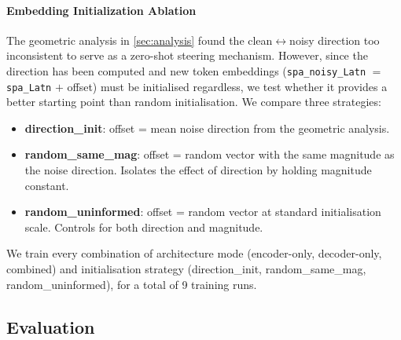 \documentclass[11pt]{article}
\begin{document}
\paragraph{Embedding Initialization Ablation}

The geometric analysis in \ref{sec:analysis} found the
clean$\leftrightarrow$noisy direction too inconsistent to serve as a zero-shot
steering mechanism. However, since the direction has been computed and new token
embeddings (\texttt{spa\_noisy\_Latn} $=$ \texttt{spa\_Latn} $+$ offset) must
be initialised regardless, we test whether it provides a better starting point
than random initialisation. We compare three strategies:

\begin{itemize}[noitemsep,topsep=2pt]
  \item \textbf{direction\_init}: offset = mean noise direction from the
        geometric analysis.
  \item \textbf{random\_same\_mag}: offset = random vector with the same
        magnitude as the noise direction. Isolates the effect of direction
        by holding magnitude constant.
  \item \textbf{random\_uninformed}: offset = random vector at standard
        initialisation scale. Controls for both direction and magnitude.
\end{itemize}

We train every combination of architecture mode (encoder-only, decoder-only,
combined) and initialisation strategy (direction\_init, random\_same\_mag,
random\_uninformed), for a total of 9 training runs. 

\subsection{Evaluation}
\label{sec:eval}
\end{document}
